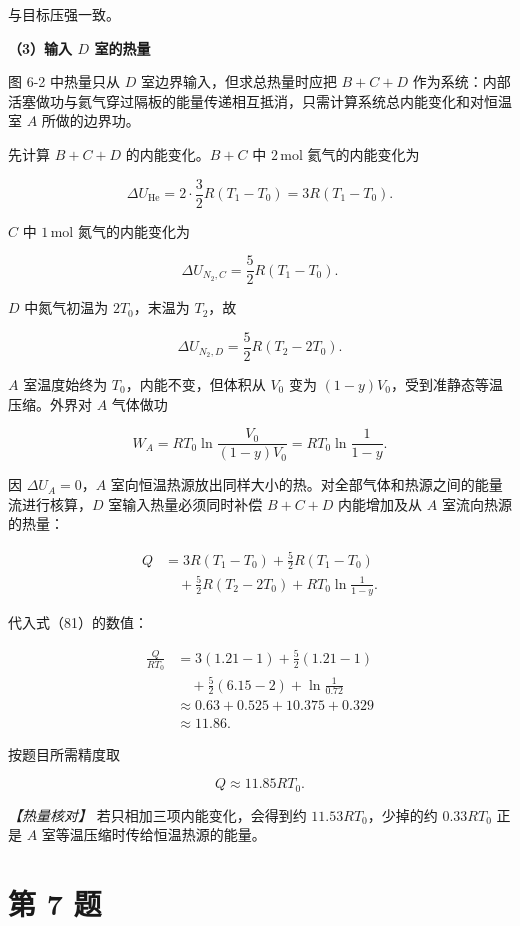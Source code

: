 \documentclass[12pt,a4paper,UTF8]{ctexart}
\begin{document}
与目标压强一致。

\textbf{（3）输入 \(D\) 室的热量}

图 6-2 中热量只从 \(D\) 室边界输入，但求总热量时应把 \(B+C+D\)
作为系统：内部活塞做功与氦气穿过隔板的能量传递相互抵消，只需计算系统总内能变化和对恒温室
\(A\) 所做的边界功。

先计算 \(B+C+D\) 的内能变化。\(B+C\) 中 \(2\,\mathrm{mol}\)
氦气的内能变化为

\[\Delta U_{\mathrm{He}}
=2\cdot\frac32R(T_1-T_0)
=3R(T_1-T_0). \tag{83}\]

\(C\) 中 \(1\,\mathrm{mol}\) 氮气的内能变化为

\[\Delta U_{N_2,C}=\frac52R(T_1-T_0). \tag{84}\]

\(D\) 中氮气初温为 \(2T_0\)，末温为 \(T_2\)，故

\[\Delta U_{N_2,D}=\frac52R(T_2-2T_0). \tag{85}\]

\(A\) 室温度始终为 \(T_0\)，内能不变，但体积从 \(V_0\) 变为
\((1-y)V_0\)，受到准静态等温压缩。外界对 \(A\) 气体做功

\[W_A=RT_0\ln\frac{V_0}{(1-y)V_0}
=RT_0\ln\frac1{1-y}. \tag{86}\]

因 \(\Delta U_A=0\)，\(A\)
室向恒温热源放出同样大小的热。对全部气体和热源之间的能量流进行核算，\(D\)
室输入热量必须同时补偿 \(B+C+D\) 内能增加及从 \(A\) 室流向热源的热量：

\[\begin{aligned}
Q
&=3R(T_1-T_0)
+\frac52R(T_1-T_0)\\
&\quad+\frac52R(T_2-2T_0)
+RT_0\ln\frac1{1-y}.
\end{aligned} \tag{87}\]

代入式（81）的数值：

\[\begin{aligned}
\frac{Q}{RT_0}
&=3(1.21-1)+\frac52(1.21-1)\\
&\quad+\frac52(6.15-2)+\ln\frac1{0.72}\\
&\approx0.63+0.525+10.375+0.329\\
&\approx11.86.
\end{aligned}\]

按题目所需精度取

\[\boxed{Q\approx11.85RT_0}. \tag{88}\]

\emph{【热量核对】} 若只相加三项内能变化，会得到约
\(11.53RT_0\)，少掉的约 \(0.33RT_0\) 正是 \(A\)
室等温压缩时传给恒温热源的能量。

\newpage

\section{第 7 题}\label{ux7b2c-7-ux9898}
\end{document}
